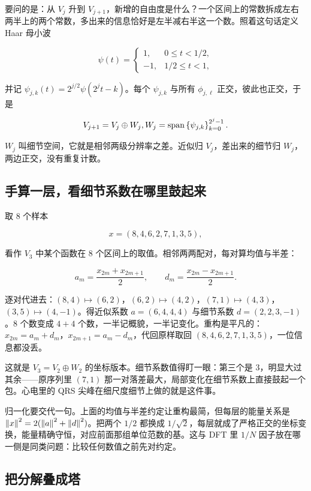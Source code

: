 要问的是：从 \(V_j\) 升到 \(V_{j+1}\)，新增的自由度是什么？一个区间上的常数拆成左右两半上的两个常数，多出来的信息恰好是左半减右半这一个数。照着这句话定义 Haar 母小波

\[
\psi(t)=
\begin{cases}
1, & 0\le t<1/2,\\
-1, & 1/2\le t<1,
\end{cases}
\]

并记 \(\psi_{j,k}(t)=2^{j/2}\psi(2^jt-k)\)。每个 \(\psi_{j,k}\) 与所有 \(\phi_{j,\ell}\) 正交，彼此也正交，于是

\[
V_{j+1}=V_j\oplus W_j,\space W_j=\operatorname{span}\left\{\psi_{j,k}\right\}_{k=0}^{2^j-1}.
\]

\(W_j\) 叫细节空间，它就是相邻两级分辨率之差。近似归 \(V_j\)，差出来的细节归 \(W_j\)，两边正交，没有重复计数。

\subsection{手算一层，看细节系数在哪里鼓起来}

取 8 个样本

\[
x=(8,4,6,2,7,1,3,5),
\]

看作 \(V_3\) 中某个函数在 8 个区间上的取值。相邻两两配对，每对算均值与半差：

\[
a_m=\frac{x_{2m}+x_{2m+1}}2,\qquad d_m=\frac{x_{2m}-x_{2m+1}}2 .
\]

逐对代进去：\((8,4)\mapsto(6,2)\)，\((6,2)\mapsto(4,2)\)，\((7,1)\mapsto(4,3)\)，\((3,5)\mapsto(4,-1)\)。得近似系数 \(a=(6,4,4,4)\) 与细节系数 \(d=(2,2,3,-1)\)。8 个数变成 \(4+4\) 个数，一半记概貌，一半记变化。重构是平凡的：\(x_{2m}=a_m+d_m\)，\(x_{2m+1}=a_m-d_m\)，代回原样取回 \((8,4,6,2,7,1,3,5)\)，一位信息都没丢。

这就是 \(V_3=V_2\oplus W_2\) 的坐标版本。细节系数值得盯一眼：第三个是 \(3\)，明显大过其余——原序列里 \((7,1)\) 那一对落差最大，局部变化在细节系数上直接鼓起一个包。心电里的 QRS 尖峰在细尺度细节上做的就是这件事。

归一化要交代一句。上面的均值与半差约定让重构最简，但每层的能量关系是 \(\left\lVert x\right\rVert^2=2(\left\lVert a\right\rVert^2+\left\lVert d\right\rVert^2)\)。把两个 \(1/2\) 都换成 \(1/\sqrt2\)，每层就成了严格正交的坐标变换，能量精确守恒，对应前面那组单位范数的基。这与 DFT 里 \(1/N\) 因子放在哪一侧是同类问题：比较任何数值之前先对约定。

\subsection{把分解叠成塔}

